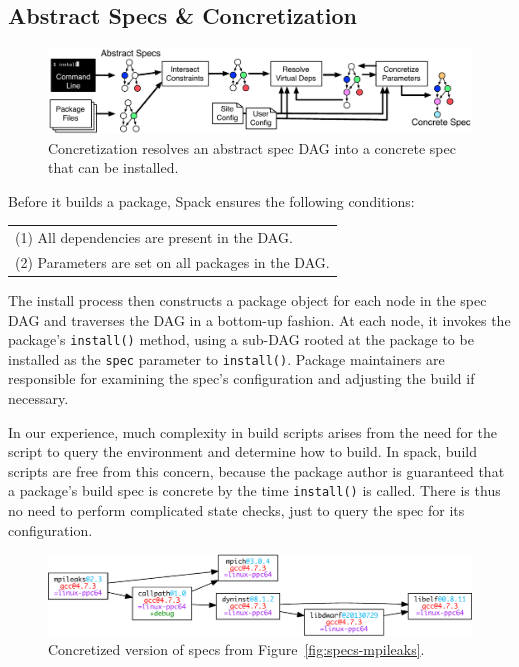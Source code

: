 
\subsection{Abstract Specs \& Concretization}


\begin{figure}
	\centering
	\includegraphics[width=\textwidth]{figs/concretization.pdf}
	\caption{
		Concretization resolves an abstract spec DAG into a concrete spec that can be installed.
		\label{fig:concretization}
	}
\end{figure}



Before it builds a package, Spack ensures the following conditions:
\newline

\begin{tabular}{l}
(1) All dependencies are present in the DAG. \\
(2) Parameters are set on all packages in the DAG. \\
\end{tabular}\newline

\noindent
The install process then constructs a package object for each node in the spec DAG
and traverses the DAG in a bottom-up fashion.  At each node, it invokes the package's
{\tt install()} method, using a sub-DAG rooted at the package to be installed as the {\tt spec}
parameter to {\tt install()}. Package maintainers are responsible for examining the spec's
configuration and adjusting the build if necessary.


In our experience, much complexity in build scripts arises from the need for the script to
query the environment and determine how to build.  In spack, build scripts are free from this 
concern, because the package author is guaranteed that a package's build spec is concrete
by the time {\tt install()} is called. There is thus no need to perform complicated state checks,
just to query the spec for its configuration.



\begin{figure}
	\centering
	\includegraphics[width=\columnwidth]{specs/mpileaks-concrete.pdf}
	\caption{
		Concretized version of specs from Figure~\ref{fig:specs-mpileaks}.
		\label{fig:specs-mpileaks-concrete}
	}
\end{figure}







